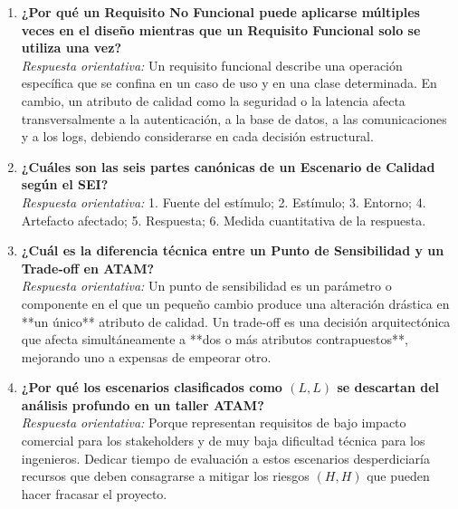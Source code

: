 \begin{enumerate}[leftmargin=1.8em]
  \item \textbf{¿Por qué un Requisito No Funcional puede aplicarse múltiples veces en el diseño mientras que un Requisito Funcional solo se utiliza una vez?} \\
  \emph{Respuesta orientativa:} Un requisito funcional describe una operación específica que se confina en un caso de uso y en una clase determinada. En cambio, un atributo de calidad como la seguridad o la latencia afecta transversalmente a la autenticación, a la base de datos, a las comunicaciones y a los logs, debiendo considerarse en cada decisión estructural.

  \item \textbf{¿Cuáles son las seis partes canónicas de un Escenario de Calidad según el SEI?} \\
  \emph{Respuesta orientativa:} 1. Fuente del estímulo; 2. Estímulo; 3. Entorno; 4. Artefacto afectado; 5. Respuesta; 6. Medida cuantitativa de la respuesta.

  \item \textbf{¿Cuál es la diferencia técnica entre un Punto de Sensibilidad y un Trade-off en ATAM?} \\
  \emph{Respuesta orientativa:} Un punto de sensibilidad es un parámetro o componente en el que un pequeño cambio produce una alteración drástica en **un único** atributo de calidad. Un trade-off es una decisión arquitectónica que afecta simultáneamente a **dos o más atributos contrapuestos**, mejorando uno a expensas de empeorar otro.

  \item \textbf{¿Por qué los escenarios clasificados como $(L, L)$ se descartan del análisis profundo en un taller ATAM?} \\
  \emph{Respuesta orientativa:} Porque representan requisitos de bajo impacto comercial para los stakeholders y de muy baja dificultad técnica para los ingenieros. Dedicar tiempo de evaluación a estos escenarios desperdiciaría recursos que deben consagrarse a mitigar los riesgos $(H, H)$ que pueden hacer fracasar el proyecto.
\end{enumerate}

